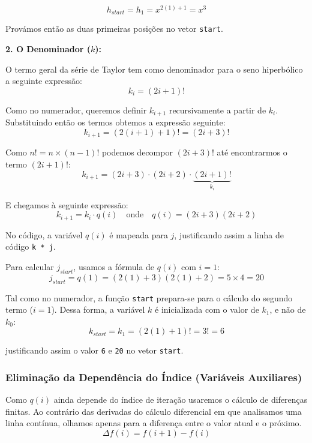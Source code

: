 \documentclass[11pt, a4paper, fleqn]{article}
\begin{document}
\begin{equation}
    h_{start} = h_1 = x^{2(1)+1} = x^3
\end{equation}

\noindent Provámos então as duas primeiras posições no vetor \texttt{start}.

\noindent \textbf{2. O Denominador ($k$):}

\noindent O termo geral da série de Taylor tem como denominador para o seno hiperbólico a seguinte expressão:
\begin{equation}
    k_i = (2i+1)!
\end{equation}

\noindent Como no numerador, queremos definir $k_{i+1}$ recursivamente a partir de $k_i$. Substituindo então os termos obtemos a expressão seguinte:
\begin{equation}
    k_{i+1} = (2(i+1)+1)! = (2i+3)!
\end{equation}

\noindent Como $n! = n \times (n-1)!$ podemos decompor $(2i+3)!$ até encontrarmos o termo $(2i+1)!$:
\begin{equation}
    k_{i+1} = (2i+3) \cdot (2i+2) \cdot \underbrace{(2i+1)!}_{k_i}
\end{equation}

\noindent E chegamos à seguinte expressão:
\begin{equation} \label{eq:denominador_base}
    k_{i+1} = k_i \cdot q(i) \quad \text{onde} \quad q(i) = (2i+3)(2i+2)
\end{equation}

\noindent No código, a variável $q(i)$ é mapeada para $j$, justificando assim a linha de código \texttt{k * j}.

\noindent Para calcular $j_{start}$, usamos a fórmula de $q(i)$ com $i=1$:
\begin{equation}
    j_{start} = q(1) = (2(1)+3)(2(1)+2) = 5 \times 4 = 20
\end{equation}

\noindent Tal como no numerador, a função \texttt{start} prepara-se para o cálculo do segundo termo ($i=1$).
Dessa forma, a variável $k$ é inicializada com o valor de $k_1$, e não de $k_0$:
\begin{equation}
    k_{start} = k_1 = (2(1)+1)! = 3! = 6
\end{equation}

\noindent justificando assim o valor \texttt{6} e \texttt{20} no vetor \texttt{start}.

\subsubsection*{Eliminação da Dependência do Índice (Variáveis Auxiliares)}
\noindent Como $q(i)$ ainda depende do índice de iteração usaremos o cálculo de diferenças finitas. Ao contrário das derivadas do cálculo diferencial em que analisamos uma linha contínua, olhamos apenas para a diferença entre o valor atual e o próximo.
\begin{equation}
    \Delta f(i) = f(i+1) - f(i)
\end{equation}
\end{document}
